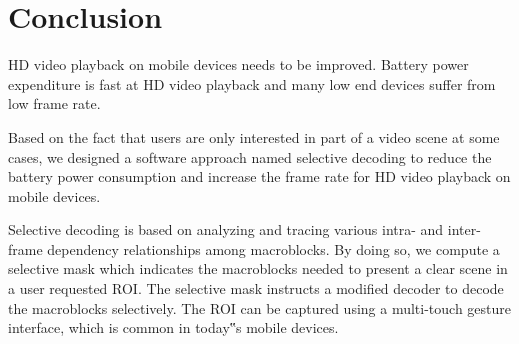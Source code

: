 \section{Conclusion}
HD video playback on mobile devices needs to be improved. Battery power expenditure is fast at HD video playback and many low end devices suffer from low frame rate.

Based on the fact that users are only interested in part of a video scene at some cases, we designed a software approach named selective decoding to reduce the battery power consumption and increase the frame rate for HD video playback on mobile devices.

Selective decoding is based on analyzing and  tracing various intra- and inter-frame dependency relationships among macroblocks. By doing so, we compute a selective mask which indicates the macroblocks needed to present a clear scene in a user requested ROI. The selective mask  instructs a modified decoder to decode the macroblocks  selectively. The ROI can be captured using a multi-touch gesture interface, which is common in today‟s mobile devices. 


